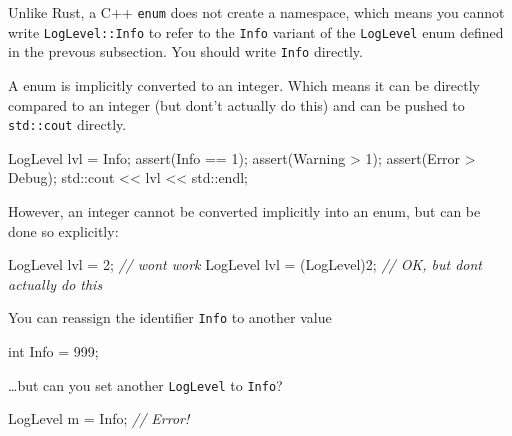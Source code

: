 \documentclass[
]{book}
\newenvironment{Shaded}{\begin{snugshade}}{\end{snugshade}}
\newcommand{\BuiltInTok}[1]{#1}
\newcommand{\CommentTok}[1]{\textcolor[rgb]{0.56,0.35,0.01}{\textit{#1}}}
\newcommand{\DataTypeTok}[1]{\textcolor[rgb]{0.13,0.29,0.53}{#1}}
\newcommand{\DecValTok}[1]{\textcolor[rgb]{0.00,0.00,0.81}{#1}}
\newcommand{\NormalTok}[1]{#1}
\newcommand{\OtherTok}[1]{\textcolor[rgb]{0.56,0.35,0.01}{#1}}
\begin{document}
Unlike Rust, a C++ \texttt{enum} does not create a namespace, which means you cannot write \texttt{LogLevel::Info}
to refer to the \texttt{Info} variant of the \texttt{LogLevel} enum defined in the prevous subsection. You should
write \texttt{Info} directly.

A enum is implicitly converted to an integer. Which means it can be directly compared to an integer
(but dont't actually do this) and can be pushed to \texttt{std::cout} directly.

\begin{Shaded}
\begin{Highlighting}[]
\NormalTok{LogLevel lvl = Info;}
\OtherTok{assert}\NormalTok{(Info == }\DecValTok{1}\NormalTok{);}
\OtherTok{assert}\NormalTok{(Warning \textgreater{} }\DecValTok{1}\NormalTok{);}
\OtherTok{assert}\NormalTok{(Error \textgreater{} Debug);}
\BuiltInTok{std::}\NormalTok{cout \textless{}\textless{} lvl \textless{}\textless{} }\BuiltInTok{std::}\NormalTok{endl;}
\end{Highlighting}
\end{Shaded}

However, an integer cannot be converted implicitly into an enum, but can be done so explicitly:

\begin{Shaded}
\begin{Highlighting}[]
\NormalTok{LogLevel lvl = }\DecValTok{2}\NormalTok{;           }\CommentTok{// won\textquotesingle{}t work}
\NormalTok{LogLevel lvl = (LogLevel)}\DecValTok{2}\NormalTok{; }\CommentTok{// OK, but don\textquotesingle{}t actually do this}
\end{Highlighting}
\end{Shaded}

You can reassign the identifier \texttt{Info} to another value

\begin{Shaded}
\begin{Highlighting}[]
\DataTypeTok{int}\NormalTok{ Info = }\DecValTok{999}\NormalTok{;}
\end{Highlighting}
\end{Shaded}

\ldots but can you set another \texttt{LogLevel} to \texttt{Info}?

\begin{Shaded}
\begin{Highlighting}[]
\NormalTok{LogLevel m = Info; }\CommentTok{// Error!}
\end{Highlighting}
\end{Shaded}
\end{document}
